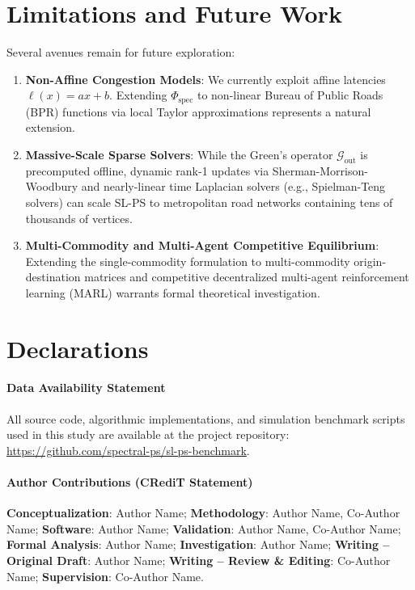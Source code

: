 \documentclass[11pt,a4paper]{article}
\begin{document}
\section{Limitations and Future Work}
\label{sec:limitations}

Several avenues remain for future exploration:
\begin{enumerate}
    \item \textbf{Non-Affine Congestion Models}: We currently exploit affine latencies $\ell(x) = ax + b$. Extending $\Phi_{\text{spec}}$ to non-linear Bureau of Public Roads (BPR) functions via local Taylor approximations represents a natural extension.
    \item \textbf{Massive-Scale Sparse Solvers}: While the Green's operator $\mathcal{G}_{\text{out}}$ is precomputed offline, dynamic rank-1 updates via Sherman-Morrison-Woodbury and nearly-linear time Laplacian solvers (e.g., Spielman-Teng solvers) can scale SL-PS to metropolitan road networks containing tens of thousands of vertices.
    \item \textbf{Multi-Commodity and Multi-Agent Competitive Equilibrium}: Extending the single-commodity formulation to multi-commodity origin-destination matrices and competitive decentralized multi-agent reinforcement learning (MARL) warrants formal theoretical investigation.
\end{enumerate}

\section*{Declarations}

\paragraph{Data Availability Statement}
All source code, algorithmic implementations, and simulation benchmark scripts used in this study are available at the project repository: \url{https://github.com/spectral-ps/sl-ps-benchmark}.

\paragraph{Author Contributions (CRediT Statement)}
\textbf{Conceptualization}: Author Name; \textbf{Methodology}: Author Name, Co-Author Name; \textbf{Software}: Author Name; \textbf{Validation}: Author Name, Co-Author Name; \textbf{Formal Analysis}: Author Name; \textbf{Investigation}: Author Name; \textbf{Writing -- Original Draft}: Author Name; \textbf{Writing -- Review \& Editing}: Co-Author Name; \textbf{Supervision}: Co-Author Name.
\end{document}
